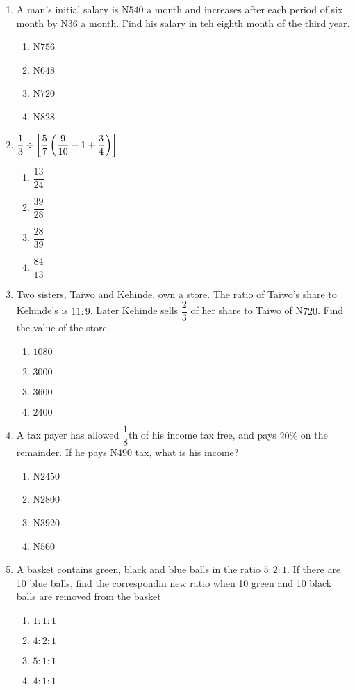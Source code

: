 \begin{multicols}{2}
\begin{enumerate}[label={\arabic*.}]
\begin{enumerate}[label={\Alph*.}]
    \end{enumerate}
\item A man's initial salary is N$540$ a month and increases after each period of six month by N$36$ a month. Find his salary in teh eighth month of the third year.
    \begin{enumerate}[label={\Alph*.}]
    \item N\(756\)
    \item N\(648\)
    \item N\(720\)
    \item N\(828\)

    \end{enumerate}
\item \(\dfrac{1}{3} \divisionsymbol \left[\dfrac{5}{7}\left(\dfrac{9}{10} - 1 + \dfrac{3}{4}\right)\right]\)
    \begin{enumerate}[label={\Alph*.}]
    \item \(\dfrac{13}{24}\)
    \item \(\dfrac{39}{28}\)
    \item \(\dfrac{28}{39}\)
    \item \(\dfrac{84}{13}\)

    \end{enumerate}
\item Two sisters, Taiwo and Kehinde, own a store. The ratio of Taiwo's share to Kehinde's is $11:9$. Later Kehinde sells $\dfrac{2}{3}$ of her share to Taiwo of N$720$. Find the value of the store.
    \begin{enumerate}[label={\Alph*.}]
    \item \(1080\)
    \item \(3000\)
    \item \(3600\)
    \item \(2400\)

    \end{enumerate}
\item A tax payer has allowed $\dfrac{1}{8}$th of his income tax free, and pays $20\%$ on the remainder. If he pays N$490$ tax, what is his income?
    \begin{enumerate}[label={\Alph*.}]
    \item N\(2450\)
    \item N\(2800\)
    \item N\(3920\)
    \item N\(560\)

    \end{enumerate}
\item A basket contains green, black and blue balls in the ratio $5:2:1$. If there are 10 blue balls, find the correspondin new ratio when 10 green and 10 black balls are removed from the basket
    \begin{enumerate}[label={\Alph*.}]
    \item \(1:1:1\)
    \item \(4:2:1\)
    \item \(5:1:1\)
    \item \(4:1:1\)


\end{enumerate}
\end{enumerate}
\end{multicols}
